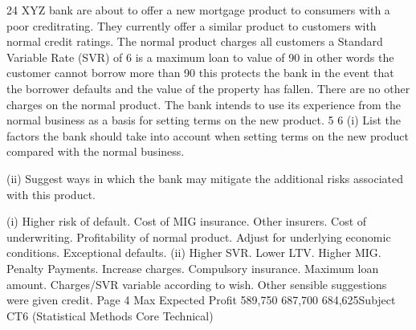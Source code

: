 \documentclass[a4paper,12pt]{article}
\begin{document}
 


24
XYZ bank are about to offer a new mortgage product to consumers with a poor creditrating. They currently offer a similar product to customers with normal credit
ratings. The normal product charges all customers a Standard Variable Rate (SVR) of 6%
is a maximum loan to value of 90%
in other words the customer cannot borrow
more than 90%
this protects the bank in the event that the borrower defaults and the value of the property has fallen.
There are no other charges on the normal product.
The bank intends to use its experience from the normal business as a basis for setting
terms on the new product.
5
6
(i) List the factors the bank should take into account when setting terms on the new product compared with the normal business.

(ii) Suggest ways in which the bank may mitigate the additional risks associated with this product.


(i) Higher risk of default.
Cost of MIG insurance.
Other insurers.
Cost of underwriting.
Profitability of normal product.
Adjust for underlying economic conditions.
Exceptional defaults.
(ii) Higher SVR.
Lower LTV.
Higher MIG.
Penalty Payments.
Increase charges.
Compulsory insurance.
Maximum loan amount.
Charges/SVR variable according to wish.
Other sensible suggestions were given credit.
Page 4
Max
Expected
Profit
589,750
687,700
684,625Subject CT6 (Statistical Methods Core Technical)
\end{document}
